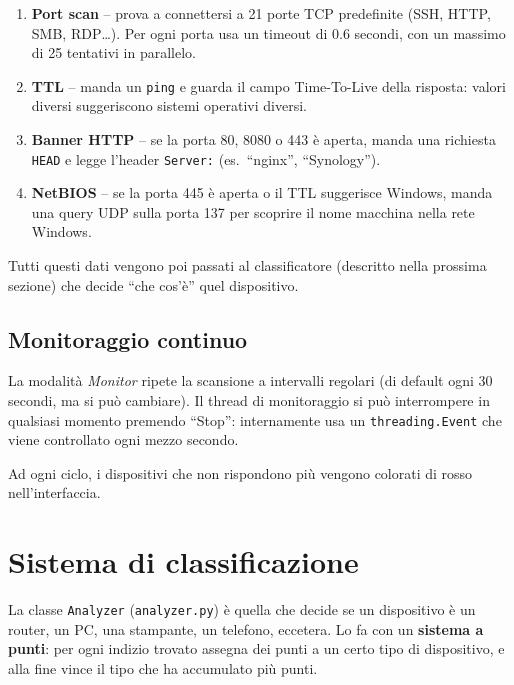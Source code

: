 \documentclass[a4paper,11pt]{article}
\begin{document}
\begin{enumerate}[nosep]
  \item \textbf{Port scan} -- prova a connettersi a 21 porte
        TCP predefinite (SSH, HTTP, SMB, RDP\ldots).
        Per ogni porta usa un timeout di 0.6 secondi, con
        un massimo di 25 tentativi in parallelo.
  \item \textbf{TTL} -- manda un \texttt{ping} e guarda il
        campo Time-To-Live della risposta: valori diversi
        suggeriscono sistemi operativi diversi.
  \item \textbf{Banner HTTP} -- se la porta 80, 8080 o 443 è
        aperta, manda una richiesta \texttt{HEAD} e legge
        l'header \texttt{Server:} (es.\ ``nginx'', ``Synology'').
  \item \textbf{NetBIOS} -- se la porta 445 è aperta o il TTL
        suggerisce Windows, manda una query UDP sulla porta 137
        per scoprire il nome macchina nella rete Windows.
\end{enumerate}

Tutti questi dati vengono poi passati al classificatore
(descritto nella prossima sezione) che decide ``che cos'è''
quel dispositivo.

\subsection{Monitoraggio continuo}

La modalità \emph{Monitor} ripete la scansione a intervalli
regolari (di default ogni 30 secondi, ma si può cambiare).
Il thread di monitoraggio si può interrompere in qualsiasi
momento premendo ``Stop'': internamente usa un
\texttt{threading.Event} che viene controllato ogni mezzo
secondo.

Ad ogni ciclo, i dispositivi che non rispondono più vengono
colorati di rosso nell'interfaccia.


\section{Sistema di classificazione}

La classe \texttt{Analyzer} (\texttt{analyzer.py}) è quella che
decide se un dispositivo è un router, un PC, una stampante,
un telefono, eccetera.  Lo fa con un \textbf{sistema a punti}:
per ogni indizio trovato assegna dei punti a un certo tipo di
dispositivo, e alla fine vince il tipo che ha accumulato più
punti.
\end{document}
